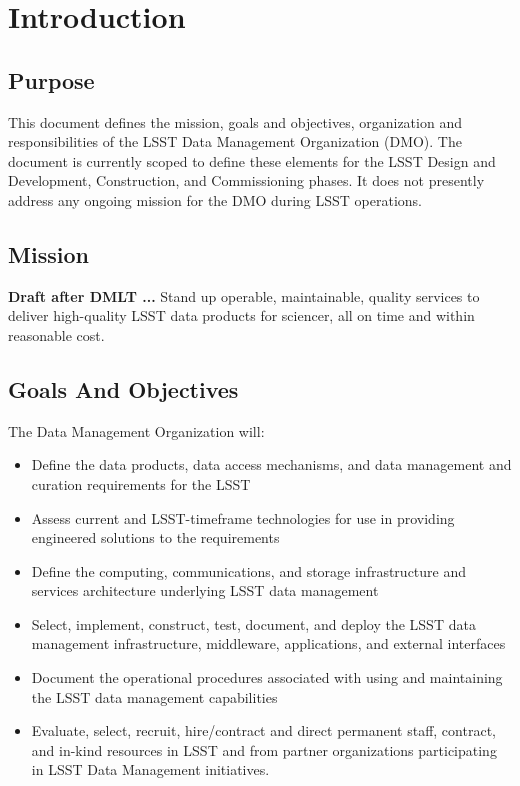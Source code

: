 \section{Introduction}
\subsection{Purpose}
This document defines the mission, goals and objectives, organization and responsibilities of the LSST Data Management Organization (DMO).  The document is currently scoped to define these elements for the LSST Design and Development, Construction, and Commissioning phases.  It does not presently address any ongoing mission for the DMO during LSST operations.

\subsection{Mission}
{\bf Draft after DMLT ...}
Stand up operable, maintainable, quality services to deliver high-quality LSST data products for sciencer, all on time and within reasonable cost.

\subsection{Goals And Objectives}
The Data Management Organization will:
\begin{itemize}
\item Define the data products, data access mechanisms, and data management and curation requirements for the LSST
\item Assess current and LSST-timeframe technologies for use in providing engineered solutions to the requirements
\item Define the computing, communications, and storage infrastructure and services architecture underlying LSST data management
\item Select, implement, construct, test, document, and deploy the LSST data management infrastructure, middleware, applications, and external interfaces
\item Document the operational procedures associated with using and maintaining the LSST data management capabilities
\item Evaluate, select, recruit, hire/contract and direct permanent staff, contract, and in-kind resources in LSST and from partner organizations participating in LSST Data Management initiatives.

\end{itemize}
	


